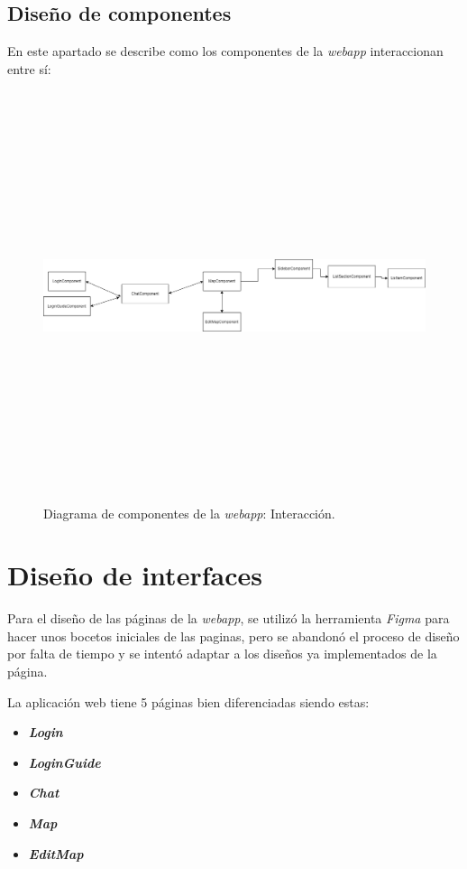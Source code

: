 \subsection{Diseño de componentes}
En este apartado se describe como los componentes de la \textit{webapp} interaccionan entre sí:
\FloatBarrier
\begin{figure}[h]
    \centering
    \includegraphics[width=12cm,height=12cm,keepaspectratio]{img/Diagrama de clases Colosseum.drawio.png}
    \caption{Diagrama de componentes de la \textit{webapp}: Interacción.}
    \label{fig:diagram_seceunce_guide}
\end{figure}
\FloatBarrier
\section{Diseño de interfaces}
Para el diseño de las páginas de la \textit{webapp}, se utilizó la herramienta \textit{Figma} para hacer unos bocetos iniciales de las paginas, pero se abandonó el proceso de diseño por falta de tiempo y se intentó adaptar a los diseños ya implementados de la página.

La aplicación web tiene 5 páginas bien diferenciadas siendo estas:
\begin{itemize}
    \item \textit{\textbf{Login}}
    \item \textit{\textbf{LoginGuide}}
    \item \textit{\textbf{Chat}}
    \item \textit{\textbf{Map}}
    \item \textit{\textbf{EditMap}}
\end{itemize}

